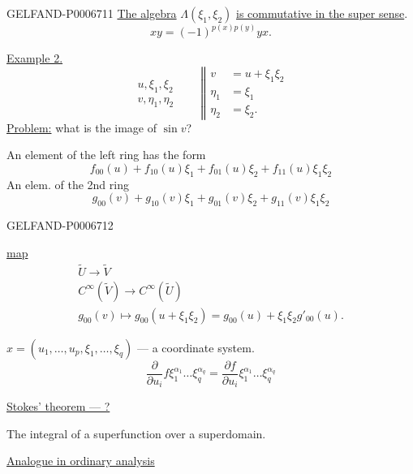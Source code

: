 \begin{GelfandAdjacentEvidence}{GELFAND-P000671}{1}
\underline{The algebra} \(\Lambda(\xi_1,\xi_2)\) \underline{is commutative in the super sense}.
\[
xy=(-1)^{p(x)p(y)}yx.
\]

\underline{Example 2.}
\[
\begin{array}{l}
u,\xi_1,\xi_2\\
v,\eta_1,\eta_2
\end{array}
\qquad
\left\Vert\begin{aligned}
v&=u+\xi_1\xi_2\\
\eta_1&=\xi_1\\
\eta_2&=\xi_2.
\end{aligned}\right.
\]
\underline{Problem:} what is the image of \(\sin v\)?

An element of the left ring has the form
\[
f_{00}(u)+f_{10}(u)\xi_1+f_{01}(u)\xi_2+f_{11}(u)\xi_1\xi_2
\]
An elem. of the 2nd ring
\[
g_{00}(v)+g_{10}(v)\xi_1+g_{01}(v)\xi_2+g_{11}(v)\xi_1\xi_2
\]
\end{GelfandAdjacentEvidence}
\begin{GelfandAdjacentEvidence}{GELFAND-P000671}{2}


\underline{map}
\[
\begin{gathered}
\widetilde U\longrightarrow\widetilde V\\
C^\infty(\widetilde V)\longrightarrow C^\infty(\widetilde U)\\
g_{00}(v)\mapsto g_{00}(u+\xi_1\xi_2)=g_{00}(u)+\xi_1\xi_2g'_{00}(u).
\end{gathered}
\]

\(x=(u_1,\ldots,u_p,\xi_1,\ldots,\xi_q)\) --- a coordinate system.
\[
\frac{\partial}{\partial u_i}f\xi_1^{\alpha_1}\ldots\xi_q^{\alpha_q}
=\frac{\partial f}{\partial u_i}\xi_1^{\alpha_1}\ldots\xi_q^{\alpha_q}
\]

\underline{Stokes’ theorem --- ?}

The integral of a superfunction over a superdomain.

\underline{Analogue in ordinary analysis}
\end{GelfandAdjacentEvidence}
